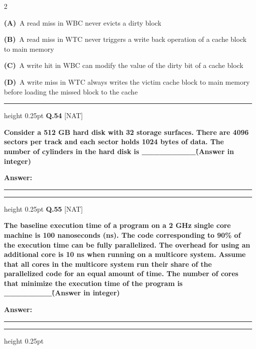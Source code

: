 \documentclass[a4paper,10pt,twoside]{article}
\begin{document}
\begin{multicols}{2}
\par\vspace{2pt}\noindent
\textbf{(A)}~A read miss in WBC never evicts a dirty block\par\vspace{2pt}\noindent
\textbf{(B)}~A read miss in WTC never triggers a write back operation of a cache block to main memory\par\vspace{2pt}\noindent
\textbf{(C)}~A write hit in WBC can modify the value of the dirty bit of a cache block\par\vspace{2pt}\noindent
\textbf{(D)}~A write miss in WTC always writes the victim cache block to main memory before loading the missed block to the cache
\par\vspace{6pt}\hrule height 0.25pt\vspace{6pt}
\noindent\textbf{Q.54} \hfill {\footnotesize\textsf{[NAT]}}
\par\vspace{2pt}
{\bfseries Consider a 512 GB hard disk with 32 storage surfaces. There are 4096 sectors per track and each sector holds 1024 bytes of data. The number of cylinders in the hard disk is \_\_\_\_\_\_\_\_\_\. (Answer in integer) \par}
\par\vspace{3pt}\noindent\textbf{Answer:} \rule{3.2cm}{0.4pt}
\par\vspace{6pt}\hrule height 0.25pt\vspace{6pt}
\noindent\textbf{Q.55} \hfill {\footnotesize\textsf{[NAT]}}
\par\vspace{2pt}
{\bfseries The baseline execution time of a program on a 2 GHz single core machine is 100 nanoseconds (ns). The code corresponding to 90\% of the execution time can be fully parallelized. The overhead for using an additional core is 10 ns when running on a multicore system. Assume that all cores in the multicore system run their share of the parallelized code for an equal amount of time.
The number of cores that minimize the execution time of the program is \_\_\_\_\_\_\_\_\. (Answer in integer) \par}
\par\vspace{3pt}\noindent\textbf{Answer:} \rule{3.2cm}{0.4pt}
\par\vspace{6pt}\hrule height 0.25pt\vspace{6pt}

\end{multicols}
\end{document}
